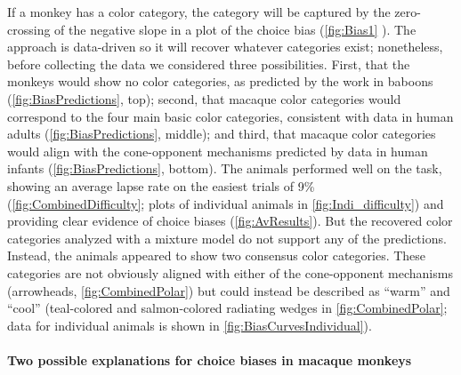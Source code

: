 If a monkey has a color category, the category will be captured by the zero-crossing of the negative slope in a plot of the choice bias (\autoref{fig:Bias1}%
). 
The approach is data-driven so it will recover whatever categories exist; nonetheless, before collecting the data we considered three possibilities. 
First, that the monkeys would show no color categories, as predicted by the work in baboons \citep{davidoff_cross-species_2010}
(\autoref{fig:BiasPredictions}, top);
second, that macaque color categories would correspond to the four main basic color categories, consistent with data in human adults \citep{bae_why_2015}
(\autoref{fig:BiasPredictions}, middle); and third, that macaque color categories would align with the cone-opponent mechanisms predicted by data in human infants \citep{skelton_biological_2017}
(\autoref{fig:BiasPredictions}, bottom). 
The animals performed well on the task, showing an average lapse rate on the easiest trials of 9\% (\autoref{fig:CombinedDifficulty}; plots of individual animals in \autoref{fig:Indi_difficulty}) and providing clear evidence of choice biases (\autoref{fig:AvResults}).
But the recovered color categories analyzed with a mixture model do not support any of the predictions. 
Instead, the animals appeared to show two consensus color categories. 
These categories are not obviously aligned with either of the cone-opponent mechanisms (arrowheads, \autoref{fig:CombinedPolar}) but could instead be described as “warm” and “cool” (teal-colored and salmon-colored radiating wedges in \autoref{fig:CombinedPolar}; data for individual animals is shown in \autoref{fig:BiasCurvesIndividual}).

\paragraph{Two possible explanations for choice biases in macaque monkeys}


